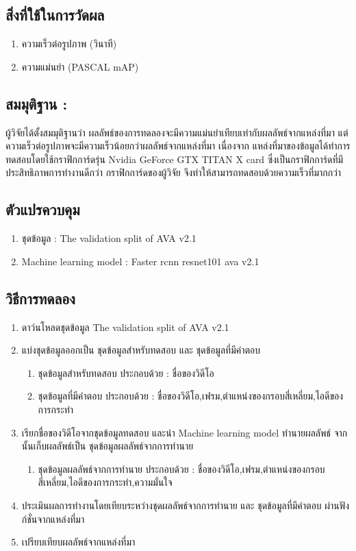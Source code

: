 \subsection*{สิ่งที่ใช้ในการวัดผล}
	\begin{enumerate}
		\item ความเร็วต่อรูปภาพ (วินาที)
		\item ความแม่นยำ (PASCAL mAP)
	\end{enumerate}
\subsection*{สมมุติฐาน :}ผู้วิจัยได้ตั้งสมมุติฐานว่า ผลลัพธ์ของการทดลองจะมีความแม่นยำเทียบเท่ากับผลลัพธ์จากแหล่งที่มา แต่ความเร็วต่อรูปภาพจะมีความเร็วน้อยกว่าผลลัพธ์จากแหล่งที่มา เนื่องจาก แหล่งที่มาของข้อมูลได้ทำการทดสอบโดยใช้กราฟิกการ์ดรุ่น Nvidia GeForce GTX TITAN X card ซึ่งเป็นกราฟิกการ์ดที่มีประสิทธิภาพการทำงานดีกว่า กราฟิกการ์ดของผู้วิจัย จึงทำให้สามารถทดสอบด้วยความเร็วที่มากกว่า
\subsection*{ตัวแปรควบคุม}
	\begin{enumerate}
		\item ชุดข้อมูล : The validation split of AVA v2.1
		\item Machine learning model : Faster rcnn resnet101 ava v2.1
	\end{enumerate}
\subsection*{วิธีการทดลอง}
	\begin{enumerate}
		\item ดาว์นโหลดชุดข้อมูล The validation split of AVA v2.1
		\item แบ่งชุดข้อมูลออกเป็น ชุดข้อมูลสำหรับทดสอบ และ ชุดข้อมูลที่มีคำตอบ
			\begin{enumerate}
				\item ชุดข้อมูลสำหรับทดสอบ ประกอบด้วย : ชื่อของวิดีโอ
				\item ชุดข้อมูลที่มีคำตอบ ประกอบด้วย : ชื่อของวิดีโอ,เฟรม,ตำแหน่งของกรอบสี่เหลี่ยม,ไอดีของการกระทำ
			\end{enumerate}
		\item เรียกชื่อของวิดีโอจากชุดข้อมูลทดสอบ และนำ Machine learning model ทำนายผลลัพธ์ จากนั้นเก็บผลลัพธ์เป็น ชุดข้อมูลผลลัพธ์จากการทำนาย
			\begin{enumerate}
				\item ชุดข้อมูลผลลัพธ์จากการทำนาย ประกอบด้วย : ชื่อของวิดีโอ,เฟรม,ตำแหน่งของกรอบสี่เหลี่ยม,ไอดีของการกระทำ,ความมั่นใจ
			\end{enumerate}
		\item ประเมินผลการทำงานโดยเทียบระหว่างชุดผลลัพธ์จากการทำนาย และ ชุดข้อมูลที่มีคำตอบ ผ่านฟังก์ชั่นจากแหล่งที่มา		
		\item เปรียบเทียบผลลัพธ์จากแหล่งที่มา
\end{enumerate}
